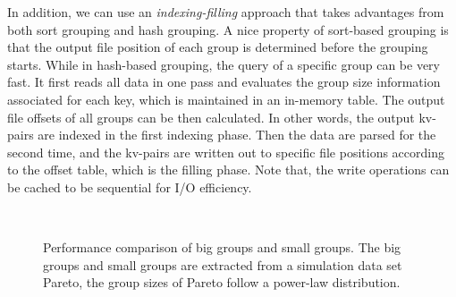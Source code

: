 In addition, we can use an \emph{indexing-filling} approach that takes advantages from both sort grouping and hash grouping. A nice property of sort-based grouping is that the output file position of each group is determined before the grouping starts. While in hash-based grouping, the query of a specific group can be very fast. It first reads all data in one pass and evaluates the group size information associated for each key, which is maintained in an in-memory table. The output file offsets of all groups can be then calculated. In other words, the output kv-pairs are indexed in the first indexing phase. Then the data are parsed for the second time, and the kv-pairs are written out to specific file positions according to the offset table, which is the filling phase. Note that, the write operations can be cached to be sequential for I/O efficiency.

\begin{figure}[t]%
    \hspace{0.23cm}
    \\
\caption{Performance comparison of big groups and small groups. The big groups and small groups are extracted from a simulation data set Pareto, the group sizes of Pareto follow a power-law distribution.}
\label{fig: big and small}
\end{figure}

